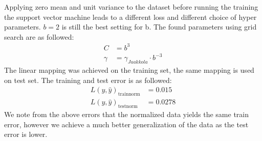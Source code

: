 \documentclass{article}
\begin{document}
Applying zero mean and unit variance to the dataset before running the training the support vector machine leads to a different loss and different choice of hyper parameters. $b=2$ is still the best setting for b. The found parameters using grid search are as followed:
\begin{align*}
C &= b^3 \\
\gamma &= \gamma_{Jaakkola} \cdot b^{-3}
\end{align*}
The linear mapping was achieved on the training set, the same mapping is used on test set. The training and test error is as followed:
\begin{align*}
L(y,\hat{y})_{\text{trainnorm}} &= 0.015 \\
L(y,\hat{y})_{\text{testnorm}} &= 0.0278
\end{align*}
We note from the above errors that the normalized data yields the same train error, however we achieve a much better generalization of the data as the test error is lower.
\end{document}
